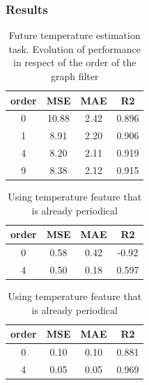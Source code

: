 \documentclass{article} %
\begin{document}
\subsubsection*{Results}
\begin{table}[!ht]
    \centering
    \begin{tabular}{c|ccc}
        order & MSE & MAE & R2 \\ \hline 
        0 & 10.88 & 2.42 & 0.896\\
        1 & 8.91 & 2.20 & 0.906\\
        4 & 8.20 & 2.11 & 0.919\\
        9 & 8.38 & 2.12 & 0.915\\
    \end{tabular}
    \caption{Future temperature estimation task. Evolution of performance in respect of the order of the graph filter}
    \label{tab:future_results}
    \hfill
\end{table}

\begin{table}[!ht]
    \centering
    \begin{minipage}{0.48\linewidth}
    \begin{tabular}{c|ccc}
        order & MSE & MAE & R2 \\ \hline 
        0 & 0.58 & 0.42 & -0.92\\
        4 & 0.50 & 0.18 & 0.597\\
    \end{tabular}
    \caption{Find day in year using precipitation}
    \label{tab:glob_prec}
    \end{minipage}
    \hfill
    \begin{minipage}{0.48\linewidth}
    \begin{tabular}{c|ccc}
        order & MSE & MAE & R2 \\ \hline 
        0 & 0.10 & 0.10 & 0.881\\
        4 & 0.05 & 0.05 & 0.969\\
    \end{tabular}
    \caption{Using temperature feature that is already periodical}
    \label{tab:glob_all}
    \end{minipage}
\end{table}
\end{document}
